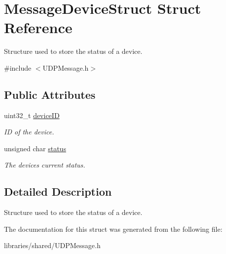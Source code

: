 \hypertarget{struct_message_device_struct}{}\section{Message\+Device\+Struct Struct Reference}
\label{struct_message_device_struct}


Structure used to store the status of a device.  




{\ttfamily \#include $<$U\+D\+P\+Message.\+h$>$}

\subsection*{Public Attributes}
\begin{DoxyCompactItemize}
\item 
\mbox{\label{struct_message_device_struct_afda673f7ffb1b0b0f906b6f839c6445a}} 
uint32\+\_\+t \hyperlink{struct_message_device_struct_afda673f7ffb1b0b0f906b6f839c6445a}{device\+ID}
\begin{DoxyCompactList}\small\item\em ID of the device. \end{DoxyCompactList}\item 
\mbox{\label{struct_message_device_struct_a9ae6a97e0b0efeb9f9e6bfbe9a0767db}} 
unsigned char \hyperlink{struct_message_device_struct_a9ae6a97e0b0efeb9f9e6bfbe9a0767db}{status}
\begin{DoxyCompactList}\small\item\em The device\textquotesingle{}s current status. \end{DoxyCompactList}\end{DoxyCompactItemize}


\subsection{Detailed Description}
Structure used to store the status of a device. 

The documentation for this struct was generated from the following file\+:\begin{DoxyCompactItemize}
\item 
libraries/shared/U\+D\+P\+Message.\+h\end{DoxyCompactItemize}
